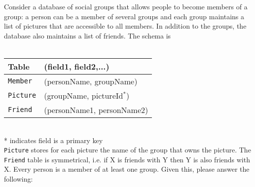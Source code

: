 \question Consider a database of social groups that allows people to become
members of a group: a person can be a member of several groups and each group
maintains a list of pictures that are accessible to all members. In addition
to the groups, the database also maintains a list of friends. The schema is\\
\\
\begin{tabular}{ll}
  Table   &(field1, field2,...) \\
  \hline
  \texttt{Member}  &(personName, groupName) \\  
  \texttt{Picture} &(groupName, pictureId$^{*}$) \\
  \texttt{Friend}  &(personName1, personName2) \\
  \hline
\end{tabular}\\
\small{* indicates field is a primary key} \\
\normalsize
\texttt{Picture} stores for each picture the name of the group that owns the 
picture. The \texttt{Friend} table is symmetrical, i.e. if X is friends with 
Y then Y is also friends with X. Every person is a member of at least one 
group. Given this, please answer the following:

